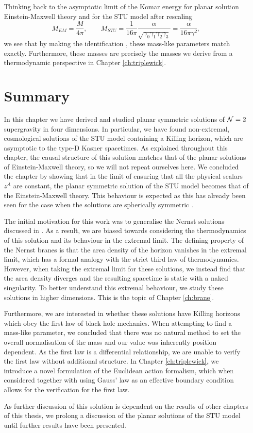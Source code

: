Thinking back to the asymptotic limit of the Komar energy for planar solution Einstein-Maxwell theory  and for the STU model after rescaling 
\begin{equation*}
	M_{EM} = \frac{M}{4 \pi}, \qquad M_{STU} = \frac{1}{16\pi} \frac{\alpha}{\sqrt{\gamma_0 \gamma_1 \gamma_2 \gamma_3}} = \frac{\alpha}{16\pi \gamma^2},
\end{equation*}
we see that by making the identification , these mass-like parameters match exactly. Furthermore, these masses are precisely the masses we derive from a thermodynamic perspective in Chapter \ref{ch:triplewick}.


\section{Summary}

In this chapter we have derived and studied planar symmetric solutions of ${\cal N} = 2$ supergravity in four dimensions. In particular, we have found non-extremal, cosmological solutions of the STU model containing a Killing horizon, which are asymptotic to the type-D Kasner spacetimes. As explained throughout this chapter, the causal structure of this solution matches that of the planar solutions of Einstein-Maxwell theory, so we will not repeat ourselves here. We concluded the chapter by showing that in the limit of ensuring that all the physical scalars $z^A$ are constant, the planar symmetric solution of the STU model becomes that of the Einstein-Maxwell theory. This behaviour is expected as this has already been seen for the case when the solutions are spherically symmetric  \cite{Ferrara:1997tw}.

The initial motivation for this work was to generalise the Nernst solutions discussed in \cite{Dempster:2015}. As a result, we are biased towards considering the thermodynamics of this solution and its behaviour in the extremal limit. The defining property of the Nernst branes is that the area density of the horizon vanishes in the extremal limit, which has a formal analogy with the strict third law of thermodynamics. However, when taking the extremal limit for these solutions, we instead find that the area density diverges and the resulting spacetime is static with a naked singularity. To better understand this extremal behaviour, we study these solutions in higher dimensions. This is the topic of Chapter \ref{ch:brane}.

Furthermore, we are interested in whether these solutions have Killing horizons which obey the first law of black hole mechanics. When attempting to find a mass-like parameter, we concluded that there was no natural method to set the overall normalisation of the mass and our value was inherently position dependent. As the first law is a differential relationship, we are unable to verify the first law without additional structure. In Chapter \ref{ch:triplewick}, we introduce a novel formulation of the Euclidean action formalism, which when considered together with using Gauss' law as an effective boundary condition allows for the verification for the first law.

As further discussion of this solution is dependent on the results of other chapters of this thesis, we prolong a discussion of the planar solutions of the STU model until further results have been presented.

